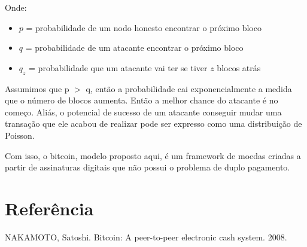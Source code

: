 \documentclass[12pt]{article}
\begin{document}
Onde:
\begin{itemize}
  \item $p$ = probabilidade de um nodo honesto encontrar o próximo bloco
  \item $q$ = probabilidade de um atacante encontrar o próximo bloco
  \item $q_z$ = probabilidade que um atacante vai ter se tiver $z$ blocos atrás
\end{itemize}

Assumimos que p $>$ q, então a probabilidade cai exponencialmente a medida que o
número de blocos aumenta. Então a melhor chance do atacante é no começo. Aliás,
o potencial de sucesso de um atacante conseguir mudar uma transação que ele
acabou de realizar pode ser expresso como uma distribuição de Poisson.

Com isso, o bitcoin, modelo proposto aqui, é um framework de moedas criadas a
partir de assinaturas digitais que não possui o problema de duplo pagamento.

\section*{Referência}
NAKAMOTO, Satoshi. Bitcoin: A peer-to-peer electronic cash system. 2008.
\end{document}

